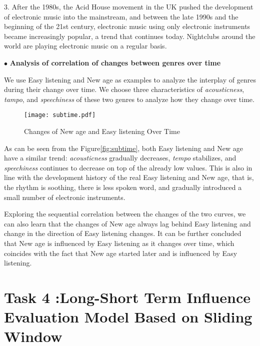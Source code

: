 \documentclass[12pt]{article}  %
\begin{document}
3. After the 1980s, the Acid House movement in the UK pushed the development of electronic music into the mainstream, and between the late 1990s and the beginning of the 21st century, electronic music using only electronic instruments became increasingly popular, a trend that continues today. Nightclubs around the world are playing electronic music on a regular basis.

$\bullet$ \textbf{ Analysis of correlation of changes between genres over time}

We use Easy listening and New age as examples to analyze the interplay of genres during their change over time. We choose three characteristics of \emph{acousticness}, \emph{tampo}, and \emph{speechiness} of these two genres to analyze how they change over time.

\begin{figure}[htbp]
	\centering
	\texttt{[image: subtime.pdf]}
	\caption{Changes of New age and Easy listening Over Time}\label{fig:subtime}
\end{figure}
\vspace{-0.5cm}
As can be seen from the Figure\eqref{fig:subtime}, both Easy listening and New age have a similar trend: \emph{acousticness} gradually decreases, \emph{tempo} stabilizes, and \emph{speechiness} continues to decrease on top of the already low values. This is also in line with the development history of the real Easy listening and New age, that is, the rhythm is soothing, there is less spoken word, and gradually introduced a small number of electronic instruments.

Exploring the sequential correlation between the changes of the two curves, we can also learn that the changes of New age always lag behind Easy listening and change in the direction of Easy listening changes. It can be further concluded that New age is influenced by Easy listening as it changes over time, which coincides with the fact that New age started later and is influenced by Easy listening.
\vspace{-0.6cm}
\section{Task 4 :Long-Short Term Influence Evaluation Model Based on Sliding Window}
\vspace{-0.5cm}
\end{document}
